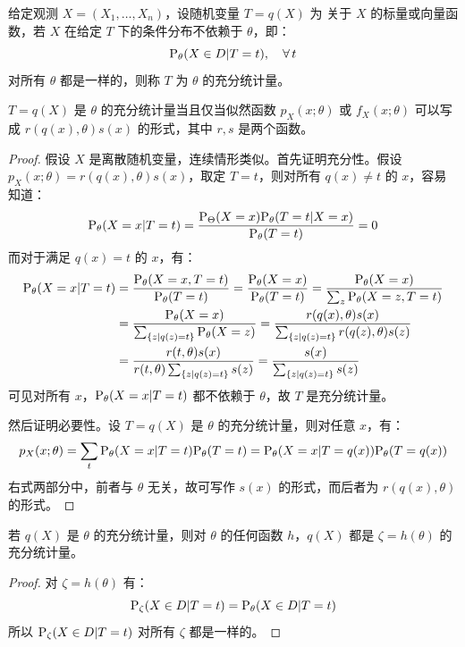 \begin{definition}[充分统计量]
给定观测 $X=(X_1,\ldots,X_n)$，设随机变量 $T=q(X)$ 为 关于 $X$ 的标量或向量函数，若 $X$ 在给定 $T$ 下的条件分布不依赖于 $\theta$，即：
\[
\mathrm{P}_\theta(X\in D\vert T=t),\quad\forall\,t
\]
对所有 $\theta$ 都是一样的，则称 $T$ 为 $\theta$ 的充分统计量。
\end{definition}

\begin{theorem}[因子分解定理]
\label{thm:factorization}
$T=q(X)$ 是 $\theta$ 的充分统计量当且仅当似然函数 $p_X(x;\theta)$ 或 $f_X(x;\theta)$ 可以写成 $r(q(x),\theta)s(x)$ 的形式，其中 $r,s$ 是两个函数。
\end{theorem}
\begin{proof}
假设 $X$ 是离散随机变量，连续情形类似。首先证明充分性。假设 $p_X(x;\theta)=r(q(x),\theta)s(x)$，取定 $T=t$，则对所有 $q(x)\neq t$ 的 $x$，容易知道：
\[
\mathrm{P}_\theta(X=x\vert T=t)=\frac{\mathrm{P}_\Theta(X=x)\mathrm{P}_\theta(T=t\vert X=x)}{\mathrm{P}_\theta(T=t)}=0
\]
而对于满足 $q(x)=t$ 的 $x$，有：
\begin{align*}
\mathrm{P}_\theta(X=x\vert T=t)&=\frac{\mathrm{P}_\theta(X=x,T=t)}{\mathrm{P}_\theta(T=t)}=\frac{\mathrm{P}_\theta(X=x)}{\mathrm{P}_\theta(T=t)}=\frac{\mathrm{P}_\theta(X=x)}{\sum_z\mathrm{P}_\theta(X=z,T=t)}\\
&=\frac{\mathrm{P}_\theta(X=x)}{\sum_{\{z\mid q(z)=t\}}\mathrm{P}_\theta(X=z)}=\frac{r(q(x),\theta)s(x)}{\sum_{\{z\mid q(z)=t\}}r(q(z),\theta)s(z)}\\
&=\frac{r(t,\theta)s(x)}{r(t,\theta)\sum_{\{z\mid q(z)=t\}}s(z)}=\frac{s(x)}{\sum_{\{z\mid q(z)=t\}}s(z)}
\end{align*}
可见对所有 $x$，$\mathrm{P}_\theta(X=x\vert T=t)$ 都不依赖于 $\theta$，故 $T$ 是充分统计量。

然后证明必要性。设 $T=q(X)$ 是 $\theta$ 的充分统计量，则对任意 $x$，有：
\[
p_X(x;\theta)=\sum_t\mathrm{P}_\theta(X=x\vert T=t)\mathrm{P}_\theta(T=t)=\mathrm{P}_\theta(X=x\vert T=q(x))\mathrm{P}_\theta(T=q(x))
\]
右式两部分中，前者与 $\theta$ 无关，故可写作 $s(x)$ 的形式，而后者为 $r(q(x),\theta)$ 的形式。
\end{proof}

\begin{theorem}
若 $q(X)$ 是 $\theta$ 的充分统计量，则对 $\theta$ 的任何函数 $h$，$q(X)$ 都是 $\zeta=h(\theta)$ 的充分统计量。
\end{theorem}
\begin{proof}
对 $\zeta=h(\theta)$ 有：
\[
\mathrm{P}_{\zeta}(X\in D\vert T=t)=\mathrm{P}_{\theta}(X\in D\vert T=t)
\]
所以 $\mathrm{P}_{\zeta}(X\in D\vert T=t)$ 对所有 $\zeta$ 都是一样的。
\end{proof}

